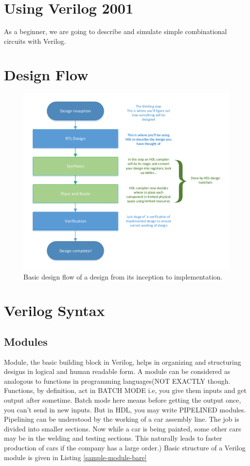 \documentclass[a4paper,10pt]{article}
\theoremstyle{mytheor}
\begin{document}
\section*{Using Verilog 2001}
As a beginner, we are going to describe and simulate simple
combinational circuits with Verilog.

\section*{Design Flow}  

\begin{figure}[h] \centering 
  \includegraphics[width=\linewidth]{./resources/hdl_design_flow.pdf}
  \caption{Basic design flow of a design from its inception to implementation.}
  \label{Fig:bst_sample_names}
\end{figure} 

\section*{Verilog Syntax}
\subsection*{Modules}
Module, the basic building block in Verilog, helps in organizing and
structuring designs in logical and human readable form. A module can
be considered as analogous to functions in programming languages(NOT
EXACTLY though. Functions, by definition, act in BATCH MODE i.e, you
give them inputs and get output after sometime. Batch mode here means
before getting the output once, you can't send in new inputs. But in
HDL, you may write PIPELINED modules. Pipelining can be understood by
the working of a car assembly line. The job is divided into smaller
sections. Now while a car is being painted, some other cars may be in
the welding and testing sections. This naturally leads to faster
production of cars if the company has a large order.) Basic structure
of a Verilog module is given in Listing \ref{sample-module-bare}
\end{document}
